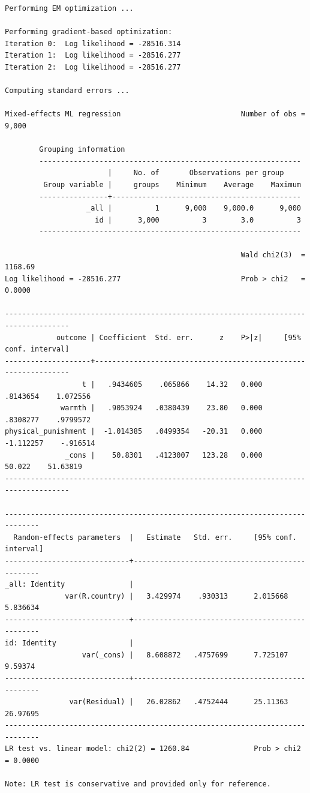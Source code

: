 \documentclass[
  letterpaper,
  DIV=11,
  numbers=noendperiod]{scrreprt}
\begin{document}
\begin{verbatim}
Performing EM optimization ...

Performing gradient-based optimization: 
Iteration 0:  Log likelihood = -28516.314  
Iteration 1:  Log likelihood = -28516.277  
Iteration 2:  Log likelihood = -28516.277  

Computing standard errors ...

Mixed-effects ML regression                            Number of obs =   9,000

        Grouping information
        -------------------------------------------------------------
                        |     No. of       Observations per group
         Group variable |     groups    Minimum    Average    Maximum
        ----------------+--------------------------------------------
                   _all |          1      9,000    9,000.0      9,000
                     id |      3,000          3        3.0          3
        -------------------------------------------------------------

                                                       Wald chi2(3)  = 1168.69
Log likelihood = -28516.277                            Prob > chi2   =  0.0000

-------------------------------------------------------------------------------------
            outcome | Coefficient  Std. err.      z    P>|z|     [95% conf. interval]
--------------------+----------------------------------------------------------------
                  t |   .9434605    .065866    14.32   0.000     .8143654    1.072556
             warmth |   .9053924   .0380439    23.80   0.000     .8308277    .9799572
physical_punishment |  -1.014385   .0499354   -20.31   0.000    -1.112257    -.916514
              _cons |    50.8301   .4123007   123.28   0.000       50.022    51.63819
-------------------------------------------------------------------------------------

------------------------------------------------------------------------------
  Random-effects parameters  |   Estimate   Std. err.     [95% conf. interval]
-----------------------------+------------------------------------------------
_all: Identity               |
              var(R.country) |   3.429974    .930313      2.015668    5.836634
-----------------------------+------------------------------------------------
id: Identity                 |
                  var(_cons) |   8.608872   .4757699      7.725107     9.59374
-----------------------------+------------------------------------------------
               var(Residual) |   26.02862   .4752444      25.11363    26.97695
------------------------------------------------------------------------------
LR test vs. linear model: chi2(2) = 1260.84               Prob > chi2 = 0.0000

Note: LR test is conservative and provided only for reference.
\end{verbatim}
\end{document}

